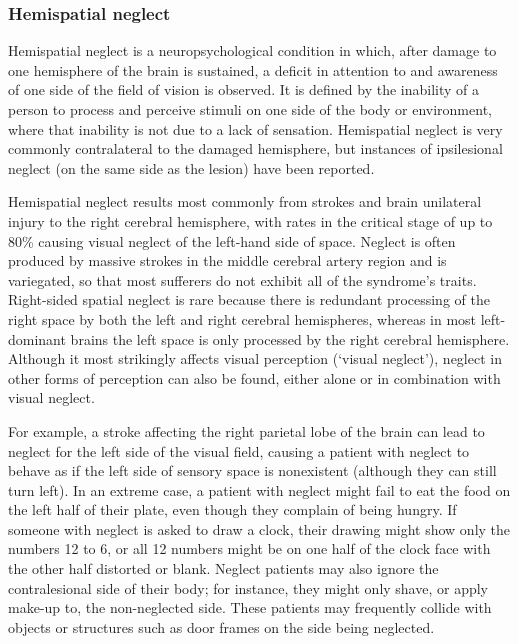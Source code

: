 \hypertarget{hemispatial-neglect}{%
\subsubsection{Hemispatial neglect}\label{hemispatial-neglect}}

Hemispatial neglect is a neuropsychological condition in which, after
damage to one hemisphere of the brain is sustained, a deficit in
attention to and awareness of one side of the field of vision is
observed. It is defined by the inability of a person to process and
perceive stimuli on one side of the body or environment, where that
inability is not due to a lack of sensation. Hemispatial neglect is very
commonly contralateral to the damaged hemisphere, but instances of
ipsilesional neglect (on the same side as the lesion) have been
reported.

Hemispatial neglect results most commonly from strokes and brain
unilateral injury to the right cerebral hemisphere, with rates in the
critical stage of up to 80\% causing visual neglect of the left-hand
side of space. Neglect is often produced by massive strokes in the
middle cerebral artery region and is variegated, so that most sufferers
do not exhibit all of the syndrome's traits. Right-sided spatial neglect
is rare because there is redundant processing of the right space by both
the left and right cerebral hemispheres, whereas in most left-dominant
brains the left space is only processed by the right cerebral
hemisphere. Although it most strikingly affects visual perception
(`visual neglect'), neglect in other forms of perception can also be
found, either alone or in combination with visual neglect.

For example, a stroke affecting the right parietal lobe of the brain can
lead to neglect for the left side of the visual field, causing a patient
with neglect to behave as if the left side of sensory space is
nonexistent (although they can still turn left). In an extreme case, a
patient with neglect might fail to eat the food on the left half of
their plate, even though they complain of being hungry. If someone with
neglect is asked to draw a clock, their drawing might show only the
numbers 12 to 6, or all 12 numbers might be on one half of the clock
face with the other half distorted or blank. Neglect patients may also
ignore the contralesional side of their body; for instance, they might
only shave, or apply make-up to, the non-neglected side. These patients
may frequently collide with objects or structures such as door frames on
the side being neglected.

